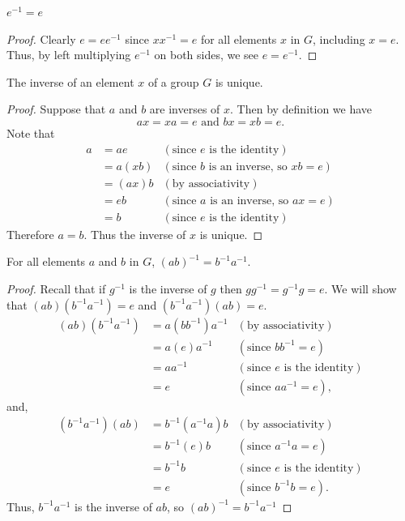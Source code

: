 \begin{proposition}\label{prop-inverse-of-identity-is-identity}
    $e^{-1} = e$
\end{proposition}
\begin{proof}
    Clearly $e = ee^{-1}$ since $xx^{-1} = e$ for all elements $x$ in $G$, including $x = e$. Thus, by left multiplying $e^{-1}$ on both sides, we see $e = e^{-1}$.
\end{proof}

\newpage

\begin{proposition}\label{prop-inverse-of-element-is-unique}
    The inverse of an element $x$ of a group $G$ is unique.
\end{proposition}
\begin{proof}
    Suppose that $a$ and $b$ are inverses of $x$. Then by definition we have
    \[
        ax = xa = e \text{ and } bx = xb = e.
    \]
    Note that
    \begin{align*}
        a &= ae & (\text{since } e \text{ is the identity})\\
        &= a(xb) & (\text{since } b \text{ is an inverse, so } xb = e)\\
        &= (ax)b & (\text{by associativity})\\
        &= eb & (\text{since } a \text{ is an inverse, so } ax = e)\\
        &= b & (\text{since } e \text{ is the identity})
    \end{align*}
    Therefore $a = b$. Thus the inverse of $x$ is unique.
\end{proof}

\begin{proposition}
    For all elements $a$ and $b$ in $G$, $(ab)^{-1} = b^{-1}a^{-1}$.
\end{proposition}
\begin{proof}
    Recall that if $g^{-1}$ is the inverse of $g$ then $gg^{-1} = g^{-1}g = e$. We will show that $(ab)(b^{-1}a^{-1}) = e$ and $(b^{-1}a^{-1})(ab) = e$.
    \begin{align*}
        (ab)(b^{-1}a^{-1}) &= a(bb^{-1})a^{-1} & (\text{by associativity})\\
        &= a(e)a^{-1} & (\text{since } bb^{-1} = e)\\
        &= aa^{-1} & (\text{since } e \text{ is the identity})\\
        &= e & (\text{since } aa^{-1} = e),
    \end{align*}
    and,
    \begin{align*}
        (b^{-1}a^{-1})(ab) &= b^{-1}(a^{-1}a)b & (\text{by associativity})\\
        &= b^{-1}(e)b & (\text{since } a^{-1}a = e)\\
        &= b^{-1}b & (\text{since } e \text{ is the identity})\\
        &= e & (\text{since } b^{-1}b = e).
    \end{align*}
    Thus, $b^{-1}a^{-1}$ is the inverse of $ab$, so $(ab)^{-1} = b^{-1}a^{-1}$
\end{proof}

